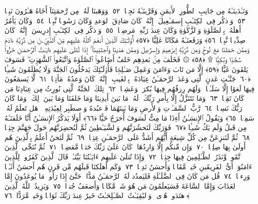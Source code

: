  وَنَـٰدَينَـٰهُ مِن جَانِبِ ٱلطُّورِ ٱلأَيمَنِ وَقَرَّبنَـٰهُ نَجِيًّۭا ﴿٥٢﴾
 وَوَهَبنَا لَهُۥ مِن رَّحمَتِنَآ أَخَاهُ هَـٰرُونَ نَبِيًّۭا ﴿٥٣﴾
 وَٱذكُر فِى ٱلكِتَـٰبِ إِسمَـٰعِيلَ ۚ إِنَّهُۥ كَانَ صَادِقَ ٱلوَعدِ وَكَانَ رَسُولًۭا نَّبِيًّۭا ﴿٥٤﴾
 وَكَانَ يَأمُرُ أَهلَهُۥ بِٱلصَّلَوٰةِ وَٱلزَّكَوٰةِ وَكَانَ عِندَ رَبِّهِۦ مَرضِيًّۭا ﴿٥٥﴾
 وَٱذكُر فِى ٱلكِتَـٰبِ إِدرِيسَ ۚ إِنَّهُۥ كَانَ صِدِّيقًۭا نَّبِيًّۭا ﴿٥٦﴾
 وَرَفَعنَـٰهُ مَكَانًا عَلِيًّا ﴿٥٧﴾
 أُو۟لَـٰٓئِكَ ٱلَّذِينَ أَنعَمَ ٱللَّهُ عَلَيهِم مِّنَ ٱلنَّبِيِّۦنَ مِن ذُرِّيَّةِ ءَادَمَ وَمِمَّن حَمَلنَا مَعَ نُوحٍۢ وَمِن ذُرِّيَّةِ إِبرَٰهِيمَ وَإِسرَٰٓءِيلَ وَمِمَّن هَدَينَا وَٱجتَبَينَآ ۚ إِذَا تُتلَىٰ عَلَيهِم ءَايَـٰتُ ٱلرَّحمَـٰنِ خَرُّوا۟ سُجَّدًۭا وَبُكِيًّۭا ۩ ﴿٥٨﴾
 ۞ فَخَلَفَ مِنۢ بَعدِهِم خَلفٌ أَضَاعُوا۟ ٱلصَّلَوٰةَ وَٱتَّبَعُوا۟ ٱلشَّهَوَٟتِ ۖ فَسَوفَ يَلقَونَ غَيًّا ﴿٥٩﴾
 إِلَّا مَن تَابَ وَءَامَنَ وَعَمِلَ صَـٰلِحًۭا فَأُو۟لَـٰٓئِكَ يَدخُلُونَ ٱلجَنَّةَ وَلَا يُظلَمُونَ شَيـًۭٔا ﴿٦٠﴾
 جَنَّـٰتِ عَدنٍ ٱلَّتِى وَعَدَ ٱلرَّحمَـٰنُ عِبَادَهُۥ بِٱلغَيبِ ۚ إِنَّهُۥ كَانَ وَعدُهُۥ مَأتِيًّۭا ﴿٦١﴾
 لَّا يَسمَعُونَ فِيهَا لَغوًا إِلَّا سَلَـٰمًۭا ۖ وَلَهُم رِزقُهُم فِيهَا بُكرَةًۭ وَعَشِيًّۭا ﴿٦٢﴾
 تِلكَ ٱلجَنَّةُ ٱلَّتِى نُورِثُ مِن عِبَادِنَا مَن كَانَ تَقِيًّۭا ﴿٦٣﴾
 وَمَا نَتَنَزَّلُ إِلَّا بِأَمرِ رَبِّكَ ۖ لَهُۥ مَا بَينَ أَيدِينَا وَمَا خَلفَنَا وَمَا بَينَ ذَٟلِكَ ۚ وَمَا كَانَ رَبُّكَ نَسِيًّۭا ﴿٦٤﴾
 رَّبُّ ٱلسَّمَـٰوَٟتِ وَٱلأَرضِ وَمَا بَينَهُمَا فَٱعبُدهُ وَٱصطَبِر لِعِبَٰدَتِهِۦ ۚ هَل تَعلَمُ لَهُۥ سَمِيًّۭا ﴿٦٥﴾
 وَيَقُولُ ٱلإِنسَـٰنُ أَءِذَا مَا مِتُّ لَسَوفَ أُخرَجُ حَيًّا ﴿٦٦﴾
 أَوَلَا يَذكُرُ ٱلإِنسَـٰنُ أَنَّا خَلَقنَـٰهُ مِن قَبلُ وَلَم يَكُ شَيـًۭٔا ﴿٦٧﴾
 فَوَرَبِّكَ لَنَحشُرَنَّهُم وَٱلشَّيَـٰطِينَ ثُمَّ لَنُحضِرَنَّهُم حَولَ جَهَنَّمَ جِثِيًّۭا ﴿٦٨﴾
 ثُمَّ لَنَنزِعَنَّ مِن كُلِّ شِيعَةٍ أَيُّهُم أَشَدُّ عَلَى ٱلرَّحمَـٰنِ عِتِيًّۭا ﴿٦٩﴾
 ثُمَّ لَنَحنُ أَعلَمُ بِٱلَّذِينَ هُم أَولَىٰ بِهَا صِلِيًّۭا ﴿٧٠﴾
 وَإِن مِّنكُم إِلَّا وَارِدُهَا ۚ كَانَ عَلَىٰ رَبِّكَ حَتمًۭا مَّقضِيًّۭا ﴿٧١﴾
 ثُمَّ نُنَجِّى ٱلَّذِينَ ٱتَّقَوا۟ وَّنَذَرُ ٱلظَّـٰلِمِينَ فِيهَا جِثِيًّۭا ﴿٧٢﴾
 وَإِذَا تُتلَىٰ عَلَيهِم ءَايَـٰتُنَا بَيِّنَـٰتٍۢ قَالَ ٱلَّذِينَ كَفَرُوا۟ لِلَّذِينَ ءَامَنُوٓا۟ أَىُّ ٱلفَرِيقَينِ خَيرٌۭ مَّقَامًۭا وَأَحسَنُ نَدِيًّۭا ﴿٧٣﴾
 وَكَم أَهلَكنَا قَبلَهُم مِّن قَرنٍ هُم أَحسَنُ أَثَـٰثًۭا وَرِءيًۭا ﴿٧٤﴾
 قُل مَن كَانَ فِى ٱلضَّلَـٰلَةِ فَليَمدُد لَهُ ٱلرَّحمَـٰنُ مَدًّا ۚ حَتَّىٰٓ إِذَا رَأَوا۟ مَا يُوعَدُونَ إِمَّا ٱلعَذَابَ وَإِمَّا ٱلسَّاعَةَ فَسَيَعلَمُونَ مَن هُوَ شَرٌّۭ مَّكَانًۭا وَأَضعَفُ جُندًۭا ﴿٧٥﴾
 وَيَزِيدُ ٱللَّهُ ٱلَّذِينَ ٱهتَدَوا۟ هُدًۭى ۗ وَٱلبَٰقِيَـٰتُ ٱلصَّـٰلِحَـٰتُ خَيرٌ عِندَ رَبِّكَ ثَوَابًۭا وَخَيرٌۭ مَّرَدًّا ﴿٧٦﴾

